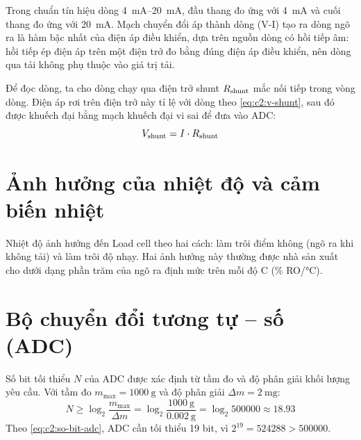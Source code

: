 Trong chuẩn tín hiệu dòng \qtyrange{4}{20}{\milli\ampere}, đầu thang đo ứng với \qty{4}{\milli\ampere}
và cuối thang đo ứng với \qty{20}{\milli\ampere}. Mạch chuyển đổi áp thành dòng (V-I) tạo ra dòng ngõ ra
là hàm bậc nhất của điện áp điều khiển, dựa trên nguồn dòng có hồi tiếp âm: hồi tiếp ép điện áp trên một
điện trở đo bằng đúng điện áp điều khiển, nên dòng qua tải không phụ thuộc vào giá trị tải.

Để đọc dòng, ta cho dòng chạy qua điện trở shunt $R_{\mathrm{shunt}}$ mắc nối tiếp trong vòng dòng. Điện áp rơi
trên điện trở này tỉ lệ với dòng theo \eqref{eq:c2:v-shunt}, sau đó được khuếch đại bằng mạch khuếch
đại vi sai để đưa vào ADC:
\begin{equation}
    V_{\mathrm{shunt}} = I \cdot R_{\mathrm{shunt}}
    \label{eq:c2:v-shunt}
\end{equation}


\section{Ảnh hưởng của nhiệt độ và cảm biến nhiệt}
\label{sec:c2:nhiet-do}

Nhiệt độ ảnh hưởng đến Load cell theo hai cách: làm trôi điểm không (ngõ ra khi không tải) và làm
trôi độ nhạy. Hai ảnh hưởng này thường được nhà sản xuất cho dưới dạng phần trăm của ngõ ra định mức
trên mỗi độ C (\unit{\percent} RO/\unit{\celsius}).


\section{Bộ chuyển đổi tương tự -- số (ADC)}
\label{sec:c2:adc}

Số bit tối thiểu $N$ của ADC được xác định từ tầm đo và độ phân giải khối lượng yêu cầu. Với tầm đo
$m_{\max} = \qty{1000}{\gram}$ và độ phân giải $\Delta m = \qty{2}{\milli\gram}$:
\begin{equation}
    N \geq \log_2 \frac{m_{\max}}{\Delta m}
      = \log_2 \frac{\qty{1000}{\gram}}{\qty{0.002}{\gram}}
      = \log_2 500000 \approx 18.93
    \label{eq:c2:so-bit-adc}
\end{equation}
Theo \eqref{eq:c2:so-bit-adc}, ADC cần tối thiểu 19 bit, vì $2^{19} = 524288 > 500000$.

